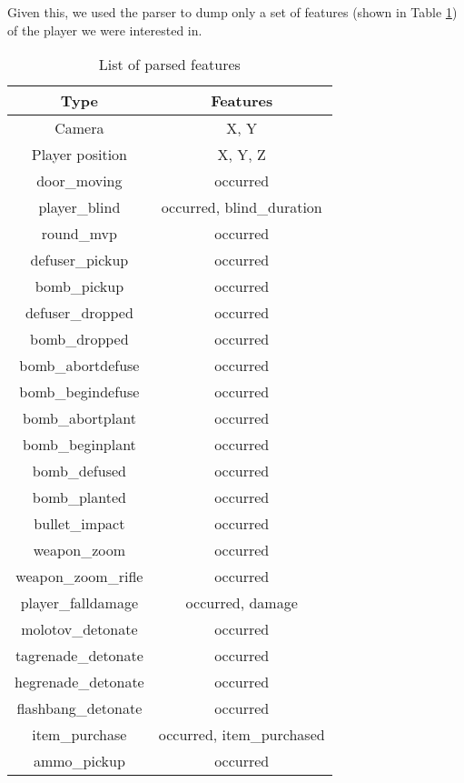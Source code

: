 	Given this, we used the parser to dump only a set of features (shown in Table \ref{tab:fea}) of the player we were interested in.
	
	\begin{table}
	
		\caption{\label{tab:fea}List of parsed features}
		\centering
		\begin{tabular}{|c|c|}
		
			\hline
			\textbf{Type} & \textbf{Features}\\
			\hline
			Camera & X, Y \\
			\hline
			Player position & X, Y, Z \\
			\hline
			door\_moving & occurred \\
			\hline
			player\_blind & occurred, blind\_duration \\
			\hline
			round\_mvp & occurred \\
			\hline
			defuser\_pickup & occurred \\
			\hline
			bomb\_pickup & occurred \\
			\hline
			defuser\_dropped & occurred \\
			\hline
			bomb\_dropped & occurred \\
			\hline
			bomb\_abortdefuse & occurred \\
			\hline
			bomb\_begindefuse & occurred \\
			\hline
			bomb\_abortplant & occurred \\
			\hline
			bomb\_beginplant & occurred \\
			\hline
			bomb\_defused & occurred \\
			\hline
			bomb\_planted & occurred \\
			\hline
			bullet\_impact & occurred \\
			\hline
			weapon\_zoom & occurred \\
			\hline
			weapon\_zoom\_rifle & occurred \\
			\hline
			player\_falldamage & occurred, damage\\
			\hline
			molotov\_detonate & occurred \\
			\hline
			tagrenade\_detonate & occurred \\
			\hline
			hegrenade\_detonate & occurred \\
			\hline
			flashbang\_detonate & occurred \\
			\hline
			item\_purchase & occurred, item\_purchased \\
			\hline
			ammo\_pickup & occurred \\

\end{tabular}
\end{table}
